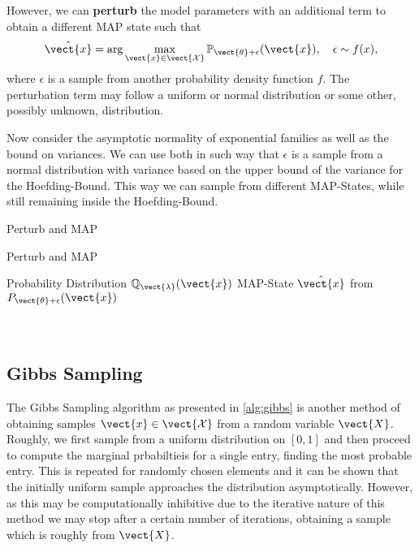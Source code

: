 However, we can \textbf{perturb} the model parameters with an additional term to obtain a different MAP state such that 
\begin{equation}
    \hat{\vect{x}}  = \arg\max_{\vect{x} \in \vect{\mathcal{X}}} \mathbb{P}_{\vect{\theta} + \epsilon}(\vect{x}), \quad \epsilon \sim f(x),
\end{equation}
where $\epsilon$ is a sample from another probability density function $f$.
The perturbation term may follow a uniform or normal distribution or some other, possibly unknown, distribution.

Now consider the asymptotic normality of exponential families as well as the bound on variances. 
We can use both in such way that $\epsilon$ is a sample from a normal distribution with variance based on the upper bound of the variance for the Hoefding-Bound.
This way we can sample from different MAP-States, while still remaining inside the Hoefding-Bound.

\begin{algo}{Perturb and MAP~\cite{papandreou2011perturb}}
    \begin{algorithm}[H]
        \caption{Perturb and MAP}
        \begin{algorithmic}
            \label{alg:pmap}
            \REQUIRE Probability Distribution $\mathbb{Q}_{\vect{\lambda}}(\vect{x})$
            \ENSURE  MAP-State $\hat{\vect{x}}$ from $P_{\vect{\theta} + \epsilon}(\vect{x})$ \\
            \\
            \\
        \end{algorithmic}
    \end{algorithm}
\end{algo}

\subsection{Gibbs Sampling}
The Gibbs Sampling algorithm as presented in \alg\ref{alg:gibbs} is another method of obtaining samples $\vect{x} \in \vect{\mathcal{X}}$ from a random variable $\vect{X}$. 
Roughly, we first sample from a uniform distribution on $[0,1]$ and then proceed to compute the marginal prbabiltieis for a single entry, finding the most probable entry.
This is repeated for randomly chosen elements and it can be shown that the initially uniform sample approaches the distribution asymptotically.
However, as this may be computationally inhibitive due to the iterative nature of this method we may stop after a certain number of iterations, obtaining a sample which is roughly from $\vect{X}$.

